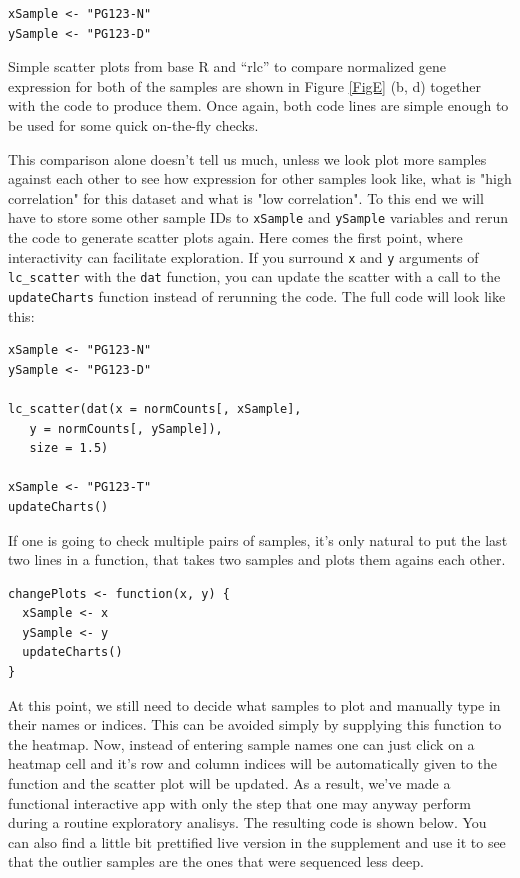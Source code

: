 \documentclass[twocolumn,10pt]{article}
\begin{document}
\begin{verbatim}
xSample <- "PG123-N"
ySample <- "PG123-D"
\end{verbatim}

Simple scatter plots from base R and ``rlc'' to compare normalized gene expression for both of the samples are shown in Figure \ref{FigE} (b, d) together with the code to produce them. Once again, both code lines are simple enough to be used for some quick on-the-fly checks.

This comparison alone doesn't tell us much, unless we look plot more samples against each other to see how expression for other samples look like, what is "high correlation" for this dataset and what is "low correlation". To this end we will have to store some other sample IDs to \texttt{xSample} and \texttt{ySample} variables and rerun the code to generate scatter plots again. Here comes the first point, where interactivity can facilitate exploration. If you surround \texttt{x} and \texttt{y} arguments of \texttt{lc_scatter} with the \texttt{dat} function, you can update the scatter with a call to the \texttt{updateCharts} function instead of rerunning the code. The full code will look like this:

\begin{verbatim}
xSample <- "PG123-N"
ySample <- "PG123-D"

lc_scatter(dat(x = normCounts[, xSample], 
   y = normCounts[, ySample]),
   size = 1.5)

xSample <- "PG123-T"
updateCharts()
\end{verbatim}

If one is going to check multiple pairs of samples, it's only natural to put the last two lines in a function, that takes two samples and plots them agains each other.

\begin{verbatim}
changePlots <- function(x, y) {
  xSample <- x
  ySample <- y
  updateCharts()
}
\end{verbatim}

At this point, we still need to decide what samples to plot and manually type in their names or indices. This can be avoided simply by supplying this function to the heatmap. Now, instead of entering sample names one can just click on a heatmap cell and it's row and column indices will be automatically given to the function and the scatter plot will be updated. As a result, we've made a functional interactive app with only the step that one may anyway perform during a routine exploratory analisys. The resulting code is shown below. You can also find a little bit prettified live version in the supplement and use it to see that the outlier samples are the ones that were sequenced less deep.
\end{document}
